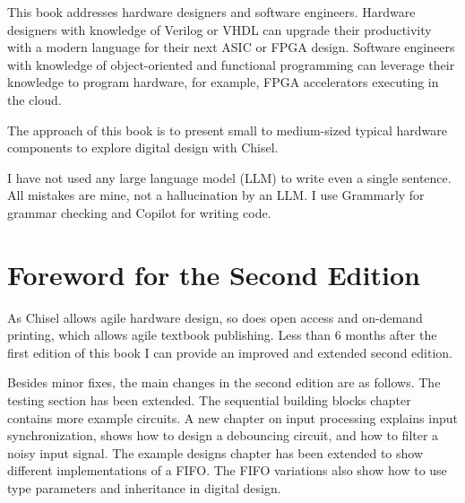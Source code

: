 \documentclass[%
    10pt,
    headinclude, footexclude,
    openright, %
    notitlepage,
    cleardoubleempty,
    headsepline,
    pointlessnumbers,
    bibtotoc, idxtotoc,
    ]{scrbook}
\begin{document}
This book addresses hardware designers and software engineers. Hardware designers with knowledge of Verilog or VHDL can upgrade their productivity with a modern language for their next ASIC or FPGA design. Software engineers with knowledge of object-oriented and functional programming can leverage their knowledge to program hardware, for example, FPGA accelerators executing in the cloud.

The approach of this book is to present small to medium-sized typical hardware components to explore digital design with Chisel.

I have not used any large language model (LLM) to write even a single sentence. All mistakes are mine, not a hallucination by an LLM. I use Grammarly for grammar checking and Copilot for writing code.




\section*{Foreword for the Second Edition}

As Chisel allows agile hardware design, so does open access and on-demand printing,
which allows agile textbook publishing. Less than 6 months after the first edition of this book
I can provide an improved and extended second edition.

Besides minor fixes, the main changes in the second edition are as follows.
The testing section has been extended. The sequential building blocks chapter contains
more example circuits. A new chapter on input processing explains input synchronization,
shows how to design a debouncing circuit, and how to filter a noisy input signal.
The example designs chapter has been extended to show different implementations of a FIFO.
The FIFO variations also show how to use type parameters and inheritance in digital design.
\end{document}
